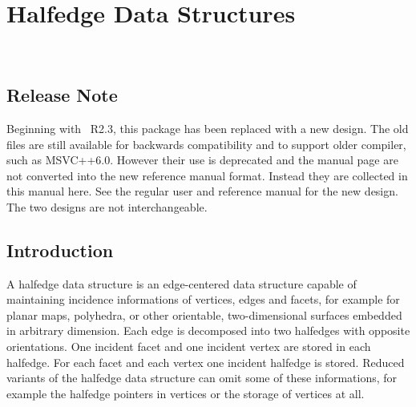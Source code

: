 
\ccParDims

\chapter{Halfedge Data Structures}
\label{chapterHds}
\\

\section{Release Note}

Beginning with \cgal\ R2.3, this package has been replaced with a new
design.  The old files are still available for backwards compatibility
and to support older compiler, such as MSVC++6.0. However their use is
deprecated and the manual page are not converted into the new
reference manual format. Instead they are collected in this manual
here. See the regular user and reference manual for the new design.
The two designs are not interchangeable.

\section{Introduction}

A halfedge data structure is an edge-centered data structure capable
of maintaining incidence informations of vertices, edges and facets,
for example for planar maps, polyhedra, or other orientable,
two-dimensional surfaces embedded in arbitrary dimension. Each edge is
decomposed into two halfedges with opposite orientations. One incident
facet and one incident vertex are stored in each halfedge.  For each
facet and each vertex one incident halfedge is stored.  Reduced
variants of the halfedge data structure can omit some of these
informations, for example the halfedge pointers in vertices or the
storage of vertices at all.

